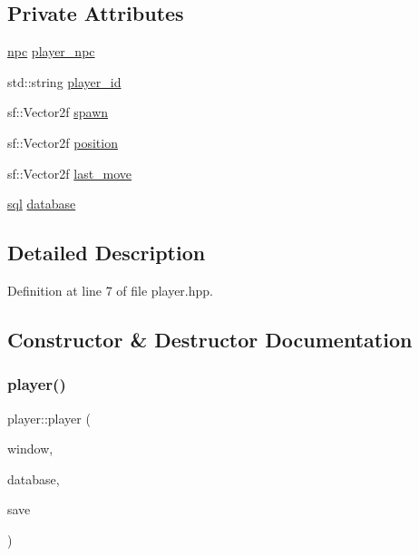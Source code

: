 \subsection*{Private Attributes}
\begin{DoxyCompactItemize}
\item 
\hyperlink{classnpc}{npc} \hyperlink{classplayer_a7f6192f63ec45be0efbf6903c1f8910e}{player\+\_\+npc}
\item 
std\+::string \hyperlink{classplayer_ab6521a8b56e507945311a7e415933a49}{player\+\_\+id}
\item 
sf\+::\+Vector2f \hyperlink{classplayer_a3809687b5d650b424726ef2f61c285de}{spawn}
\item 
sf\+::\+Vector2f \hyperlink{classplayer_a7e37704e10e2be3e02a155127495727e}{position}
\item 
sf\+::\+Vector2f \hyperlink{classplayer_a856eed939c632225be8287f0b56df8d0}{last\+\_\+move}
\item 
\hyperlink{classsql}{sql} \hyperlink{classplayer_aa5560a5bdfc340ad6def011573ee5eb7}{database}
\end{DoxyCompactItemize}


\subsection{Detailed Description}


Definition at line 7 of file player.\+hpp.



\subsection{Constructor \& Destructor Documentation}
\mbox{\label{classplayer_a1a369fcd087aa48f9241fb20c8df52f3}} 
\subsubsection{\texorpdfstring{player()}{player()}}
{\footnotesize\ttfamily player\+::player (\begin{DoxyParamCaption}\item[{sf\+::\+Render\+Window \&}]{window,  }\item[{\hyperlink{classsql}{sql} \&}]{database,  }\item[{std\+::string}]{save }\end{DoxyParamCaption})}



